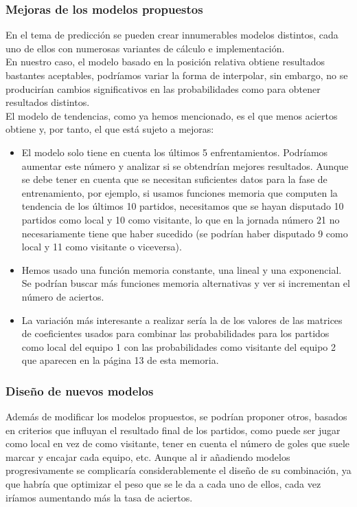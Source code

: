 \subsubsection*{Mejoras de los modelos propuestos}
En el tema de predicción se pueden crear innumerables modelos distintos, cada uno de ellos con numerosas variantes de cálculo e implementación. \\

En nuestro caso, el modelo basado en la posición relativa obtiene resultados bastantes aceptables, podríamos variar la forma de interpolar, sin embargo, no se producirían cambios significativos en las probabilidades como para obtener resultados distintos.\\

El modelo de tendencias, como ya hemos mencionado, es el que menos aciertos obtiene y, por tanto, el que está sujeto a mejoras:
\begin{itemize}
	\item El modelo solo tiene en cuenta los últimos 5 enfrentamientos. Podríamos aumentar este número y analizar si se obtendrían mejores resultados. Aunque se debe tener en cuenta que se necesitan suficientes datos para la fase de entrenamiento, por ejemplo, si usamos funciones memoria que computen la tendencia de los últimos 10 partidos, necesitamos que se hayan disputado 10 partidos como local y 10 como visitante, lo que en la jornada número 21 no necesariamente tiene que haber sucedido (se podrían haber disputado 9 como local y 11 como visitante o viceversa).
	\item Hemos usado una función memoria constante, una lineal y una exponencial. Se podrían buscar más funciones memoria alternativas y ver si incrementan el número de aciertos.
	\item La variación más interesante a realizar sería la de los valores de las matrices de coeficientes usados para combinar las probabilidades para los partidos como local del equipo 1 con las probabilidades como visitante del equipo 2 que aparecen en la página 13 de esta memoria.
\end{itemize}

\subsubsection*{Diseño de nuevos modelos}
Además de modificar los modelos propuestos, se podrían proponer otros, basados en criterios que influyan el resultado final de los partidos, como puede ser jugar como local en vez de como visitante, tener en cuenta el número de goles que suele marcar y encajar cada equipo, etc. 
Aunque al ir añadiendo modelos progresivamente se complicaría considerablemente el diseño de su combinación, ya que habría que optimizar el peso que se le da a cada uno de ellos, cada vez iríamos aumentando más la tasa de aciertos.\\

